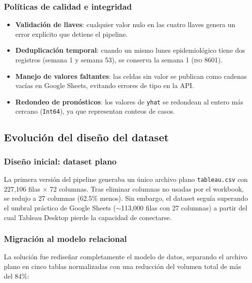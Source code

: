 \documentclass[12pt, letterpaper]{article}
\begin{document}
\subsubsection{Políticas de calidad e integridad}

\begin{itemize}[noitemsep]
    \item \textbf{Validación de llaves}: cualquier valor nulo en las cuatro llaves genera un error explícito que detiene el pipeline.
    \item \textbf{Deduplicación temporal}: cuando un mismo lunes epidemiológico tiene dos registros (semana 1 y semana 53), se conserva la semana 1 (\textsc{iso} 8601).
    \item \textbf{Manejo de valores faltantes}: las celdas sin valor se publican como cadenas vacías en Google Sheets, evitando errores de tipo en la API.
    \item \textbf{Redondeo de pronósticos}: los valores de \texttt{yhat} se redondean al entero más cercano (\texttt{Int64}), ya que representan conteos de casos.
\end{itemize}

\newpage
\subsection{Evolución del diseño del dataset}\label{subsec:evolucion_dataset}

\subsubsection{Diseño inicial: dataset plano}

La primera versión del pipeline generaba un único archivo plano \texttt{tableau.csv} con 227,106 filas $\times$ 72 columnas. Tras eliminar columnas no usadas por el workbook, se redujo a 27 columnas (62.5\% menos). Sin embargo, el dataset seguía superando el umbral práctico de Google Sheets ($\sim$113,000 filas con 27 columnas) a partir del cual Tableau Desktop pierde la capacidad de conectarse.

\subsubsection{Migración al modelo relacional}

La solución fue rediseñar completamente el modelo de datos, separando el archivo plano en cinco tablas normalizadas con una reducción del volumen total de más del 84\%:
\end{document}
